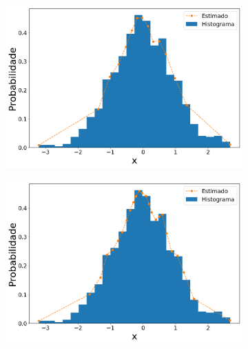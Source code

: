 \begin{figure}[H]
	\centering\begin{subfigure}[b]{0.45\textwidth}
		\centering 
		\includegraphics[width=\linewidth]{./figuras/CDFm_normal_15_1000_0}
		\caption{}
		\label{fig:cdf_norm15_data}
	\end{subfigure}
	\hfill
	\begin{subfigure}[b]{0.45\textwidth}
		\centering 
		\includegraphics[width=\linewidth]{./figuras/CDFm_normal_25_1000_0}
		\caption{}
		\label{fig:cdf_norm25_data}
	\end{subfigure}
	\\
	\begin{subfigure}[b]{0.45\textwidth}
		\centering 

\end{subfigure}
\end{figure}
